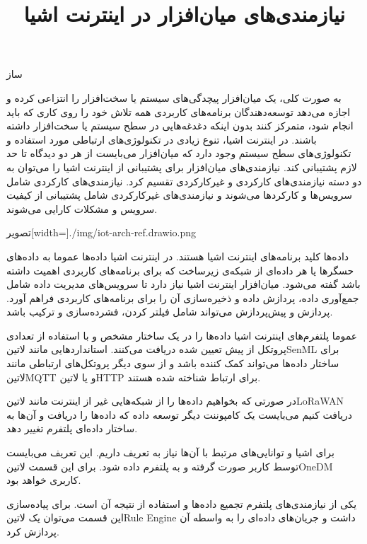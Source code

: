 \documentclass[]{./reports}
\title{نیازمندی‌های میان‌افزار در اینترنت اشیا}
\begin{document}
‌ساز

به صورت کلی، یک میان‌افزار پیچدگی‌های سیستم یا سخت‌افزار را انتزاعی کرده و اجازه می‌دهد
توسعه‌دهندگان برنامه‌های کاربردی همه تلاش خود را روی کاری که باید انجام شود، متمرکز کنند بدون
اینکه دغدغه‌هایی در سطح سیستم یا سخت‌افزار داشته باشند.
در اینترنت اشیا، تنوع زیادی در تکنولوژی‌های ارتباطی مورد استفاده و تکنولوژی‌های سطح سیستم وجود دارد که
میان‌افزار می‌بایست از هر دو دیدگاه تا حد لازم پشتیبانی کند.
نیازمندی‌های میان‌افزار برای پشتیبانی از اینترنت اشیا را می‌توان به دو دسته نیازمندی‌های کارکردی و غیرکارکردی تقسیم کرد.
نیازمندی‌های کارکردی شامل سرویس‌ها و کارکردها می‌شوند و نیازمندی‌های غیرکارکردی شامل پشتیبانی از کیفیت سرویس
و مشکلات کارایی می‌شوند.

‌تصویر[width=\textwidth]{./img/iot-arch-ref.drawio.png }


داده‌ها کلید برنامه‌های اینترنت اشیا هستند. در اینترنت اشیا داده‌ها عموما به داده‌های حسگرها
یا هر داده‌ای از شبکه‌ی زیرساخت که برای برنامه‌های کاربردی اهمیت داشته باشد گفته می‌شود.
میان‌افزار اینترنت اشیا نیاز دارد تا سرویس‌های مدیریت داده شامل جمع‌آوری داده، پردازش داده و ذخیره‌سازی
آن را برای برنامه‌های کاربردی فراهم آورد.
پردازش و پیش‌پردازش می‌تواند شامل فیلتر کردن، فشرده‌سازی و ترکیب باشد.


عموما پلتفرم‌های اینترنت اشیا داده‌ها را در یک ساختار مشخص
و با استفاده از تعدادی پروتکل از پیش تعیین شده دریافت می‌کنند.
استانداردهایی مانند ‌لاتین{SenML} برای ساختار داده‌ها می‌تواند
کمک کننده باشد و از سوی دیگر پروتکل‌های ارتباطی مانند ‌لاتین{MQTT}
و یا ‌لاتین{HTTP} برای ارتباط شناخته شده هستند.

در صورتی که بخواهیم داده‌ها را از شبکه‌هایی غیر از اینترنت مانند ‌لاتین{LoRaWAN}
دریافت کنیم می‌بایست یک کامپوننت دیگر توسعه داده که داده‌ها را دریافت و آن‌ها به ساختار
داده‌ای پلتفرم تغییر دهد.


برای اشیا و توانایی‌های مرتبط با آن‌ها نیاز به تعریف داریم. این تعریف می‌بایست توسط کاربر صورت
گرفته و به پلتفرم داده شود. برای این قسمت ‌لاتین{OneDM} کاربری خواهد بود.


یکی از نیازمندی‌های پلتفرم تجمیع داده‌ها و استفاده از نتیجه آن است.
برای پیاده‌سازی این قسمت می‌توان یک ‌لاتین{Rule Engine} داشت و جریان‌های داده‌ای
را به واسطه آن پردازش کرد.
\end{document}
